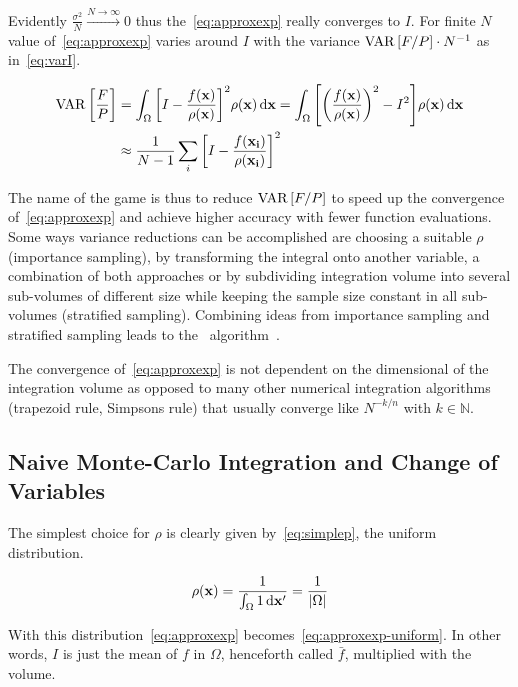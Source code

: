 Evidently \(\frac{\sigma^2}{N}\xrightarrow{N\rightarrow\infty} 0\)
thus the~\eqref{eq:approxexp} really converges to \(I\). For finite
\(N\) value of~\eqref{eq:approxexp} varies around \(I\) with the
variance \(\operatorname{VAR}\qty[F/P]\cdot N^{-1}\) as in~\eqref{eq:varI}.

\begin{align}
  \operatorname{VAR}\qty[\frac{F}{P}] &= \int_\Omega \qty[I -
  \frac{f(\vb{x})}{\rho(\vb{x})}]^2 \rho({\vb{x}}) \dd{\vb{x}} =
  \int_\Omega \qty[\qty(\frac{f(\vb{x})}{\rho(\vb{x})})^2 -
  I^2]\rho({\vb{x}}) \dd{\vb{x}}   \label{eq:varI}
 \\
  &\approx \frac{1}{N - 1}\sum_i \qty[I -
  \frac{f(\vb{x_i})}{\rho(\vb{x_i})}]^2  \label{eq:varI-approx}
\end{align}

The name of the game is thus to reduce \(\operatorname{VAR}\qty[F/P]\) to speed up
the convergence of~\eqref{eq:approxexp} and achieve higher accuracy
with fewer function evaluations. Some ways variance reductions can be
accomplished are choosing a suitable \(\rho\) (importance sampling),
by transforming the integral onto another variable, a combination of
both approaches or by subdividing integration volume into several
sub-volumes of different size while keeping the sample size constant
in all sub-volumes (stratified sampling). Combining ideas from
importance sampling and stratified sampling leads to the \vegas\
algorithm~\cite{Lepage:19781an}.

The convergence of~\eqref{eq:approxexp} is not dependent on the
dimensional of the integration volume as opposed to many other
numerical integration algorithms (trapezoid rule, Simpsons rule) that
usually converge like \(N^{-k/n}\) with \(k\in\mathbb{N}\).

\subsection{Naive Monte-Carlo Integration and Change of Variables}
\label{sec:naivechange}

The simplest choice for \(\rho\) is clearly given
by~\eqref{eq:simplep}, the uniform distribution.

\begin{equation}
  \label{eq:simplep}
  \rho(\vb{x}) = \frac{1}{\int_{\Omega}1\dd{\vb{x'}}} =
  \frac{1}{\abs{\Omega}}
\end{equation}

With this distribution~\eqref{eq:approxexp}
becomes~\eqref{eq:approxexp-uniform}. In other words, \(I\) is just
the mean of \(f\) in \(\Omega\), henceforth
called \(\bar{f}\), multiplied with the volume.

